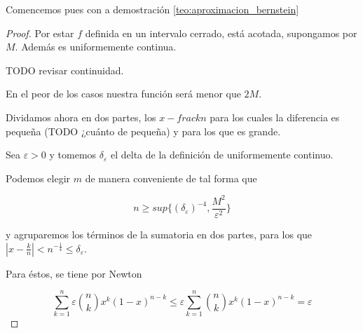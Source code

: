 Comencemos pues con a demostración \ref{teo:aproximacion_bernstein}
\begin{proof}
    Por estar $f$ definida en un intervalo cerrado, está acotada, supongamos por $M$. 
    Además es uniformemente continua. 
    
    TODO revisar continuidad.
    
    En el peor de los casos nuestra función será menor que $2M$. 


    Dividamos ahora en dos partes, los $x- frac{k}{n}$ para los cuales la diferencia es pequeña (TODO ¿cuánto de pequeña) y para los que es grande. 

    Sea $\varepsilon > 0$ y tomemos $\delta_ \varepsilon$ el delta de la definición de uniformemente continuo.  

    Podemos elegir $m$ de manera conveniente de tal forma que 

    $$ n \geq sup \{ (\delta_\varepsilon) ^{-4}, \frac{M^2}{\varepsilon^2}\}$$


    y agruparemos los términos de la sumatoria en dos partes, para los que 
    $|x - \frac{k}{n}| < n^{ -\frac{1}{4}} \leq \delta_\varepsilon$. 

    Para éstos,  se tiene por Newton  

    \begin{equation*}
        \sum_{k=1}^n   \varepsilon \binom{n}{k} x^k (1-x)^{n-k} \leq \varepsilon \sum_{k=1}^n \binom{n}{k} x^k (1-x)^{n-k} =  \varepsilon
    \end{equation*}

\end{proof}

 
 
\endinput 